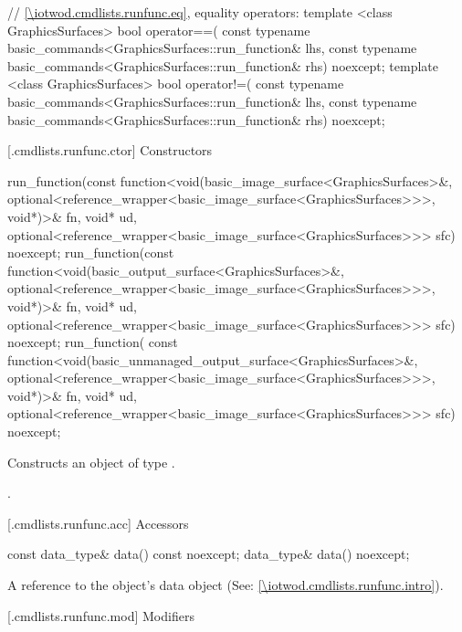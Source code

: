 \begin{codeblock}
{  // \ref{\iotwod.cmdlists.runfunc.eq}, equality operators:
  template <class GraphicsSurfaces>
  bool operator==(
    const typename basic_commands<GraphicsSurfaces::run_function& lhs,
    const typename basic_commands<GraphicsSurfaces::run_function& rhs) 
    noexcept;
  template <class GraphicsSurfaces>
  bool operator!=(
    const typename basic_commands<GraphicsSurfaces::run_function& lhs,
    const typename basic_commands<GraphicsSurfaces::run_function& rhs) 
    noexcept;
}
\end{codeblock}

 [\iotwod.cmdlists.runfunc.ctor] {Constructors}%

%
\begin{itemdecl}
run_function(const function<void(basic_image_surface<GraphicsSurfaces>&, 
  optional<reference_wrapper<basic_image_surface<GraphicsSurfaces>>>, 
  void*)>& fn, void* ud, 
  optional<reference_wrapper<basic_image_surface<GraphicsSurfaces>>> sfc) 
  noexcept;
run_function(const function<void(basic_output_surface<GraphicsSurfaces>&, 
  optional<reference_wrapper<basic_image_surface<GraphicsSurfaces>>>, 
  void*)>& fn, void* ud, 
  optional<reference_wrapper<basic_image_surface<GraphicsSurfaces>>> sfc) 
  noexcept;
run_function(
  const function<void(basic_unmanaged_output_surface<GraphicsSurfaces>&, 
  optional<reference_wrapper<basic_image_surface<GraphicsSurfaces>>>, 
  void*)>& fn, void* ud, 
  optional<reference_wrapper<basic_image_surface<GraphicsSurfaces>>> sfc) 
  noexcept;
\end{itemdecl}
\begin{itemdescr}
\pnum
\effects Constructs an object of type .

\pnum
\postconditions {}.
\end{itemdescr}

 [\iotwod.cmdlists.runfunc.acc] {Accessors}%

%
\begin{itemdecl}
const data_type& data() const noexcept;
data_type& data() noexcept;
\end{itemdecl}
\begin{itemdescr}
\pnum
\returns A reference to the  object's data object (See: \ref{\iotwod.cmdlists.runfunc.intro}).
\end{itemdescr}

 [\iotwod.cmdlists.runfunc.mod] {Modifiers}%

